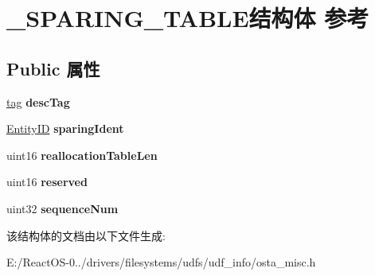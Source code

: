\hypertarget{struct___s_p_a_r_i_n_g___t_a_b_l_e}{}\section{\+\_\+\+S\+P\+A\+R\+I\+N\+G\+\_\+\+T\+A\+B\+L\+E结构体 参考}
\label{struct___s_p_a_r_i_n_g___t_a_b_l_e}
\subsection*{Public 属性}
\begin{DoxyCompactItemize}
\item 
\mbox{\label{struct___s_p_a_r_i_n_g___t_a_b_l_e_a1ee531ab536a303e6fb9a6029ce5f5a1}} 
\hyperlink{structtag}{tag} {\bfseries desc\+Tag}
\item 
\mbox{\label{struct___s_p_a_r_i_n_g___t_a_b_l_e_ac7a4e931dc93146e8b8c79f4e0068753}} 
\hyperlink{struct_entity_i_d}{Entity\+ID} {\bfseries sparing\+Ident}
\item 
\mbox{\label{struct___s_p_a_r_i_n_g___t_a_b_l_e_a6ccbd414505b9cac5f2a4c061e2da6e1}} 
uint16 {\bfseries reallocation\+Table\+Len}
\item 
\mbox{\label{struct___s_p_a_r_i_n_g___t_a_b_l_e_a8b3d5ee8ffc1a7685ebdf2e179b48b8a}} 
uint16 {\bfseries reserved}
\item 
\mbox{\label{struct___s_p_a_r_i_n_g___t_a_b_l_e_a142529efa2e3c7ad28c966418b886d93}} 
uint32 {\bfseries sequence\+Num}
\end{DoxyCompactItemize}


该结构体的文档由以下文件生成\+:\begin{DoxyCompactItemize}
\item 
E\+:/\+React\+O\+S-\/0../drivers/filesystems/udfs/udf\+\_\+info/osta\+\_\+misc.\+h\end{DoxyCompactItemize}

